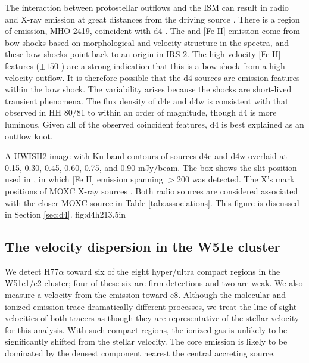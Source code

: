 The interaction between protostellar outflows and the ISM can result in radio
and X-ray emission at great distances from the driving source \citep[e.g.,
HH80/81][]{Lopez-Santiago2013a,Masque2015a}.  There is a region of \hh emission,
MHO 2419, coincident with d4 \citep[Figure
\ref{fig:d4h2}][]{Hodapp2002a,Froebrich2011a}.  The \hh and [Fe II] emission
come from bow shocks based on morphological and velocity structure in the
\citet{Hodapp2002a} spectra, and these bow shocks point back to an origin in
IRS 2.  The high velocity [Fe II] features ($\pm150$ \kms) are a strong
indication that this is a bow shock from a high-velocity outflow.  It is
therefore possible that the d4 sources are emission features within the bow
shock.  The variability arises because the shocks are short-lived transient
phenomena.  The flux density of d4e and d4w is consistent with that observed
in HH 80/81 \citep{Masque2015a} to within an order of magnitude, though d4
is more luminous.  Given all of the observed coincident features, d4 is best
explained as an outflow knot.  

{A UWISH2 \hh image with Ku-band contours of sources d4e and d4w overlaid at
0.15, 0.30, 0.45, 0.60, 0.75, and 0.90 mJy/beam.  The box shows the slit
position used in \citet{Hodapp2002a}, in which [Fe II] emission spanning
$>200$ \kms was detected.  The X's mark positions of MOXC X-ray
sources \citep{Townsley2014a}.  Both radio sources are considered
associated with the closer MOXC source in Table \ref{tab:associations}.
This figure is discussed in Section \ref{sec:d4}.
}
{fig:d4h2}{1}{3.5in}

\subsection{The velocity dispersion in the W51e cluster}
\label{sec:vdisp}
We detect H77$\alpha$ toward six of the eight hyper/ultra compact \hii regions
in the W51e1/e2 cluster; four of these six are firm detections and two
are weak.  We also measure a velocity from the \formaldehyde emission toward
e8.  Although the molecular and ionized emission trace dramatically different
processes, we treat the line-of-sight velocities of both tracers as though they
are representative of the stellar velocity for this analysis.  With such
compact \hii regions, the ionized gas is unlikely to be significantly shifted
from the stellar velocity.  The core emission is likely to be dominated by the
densest component nearest the central accreting source.

